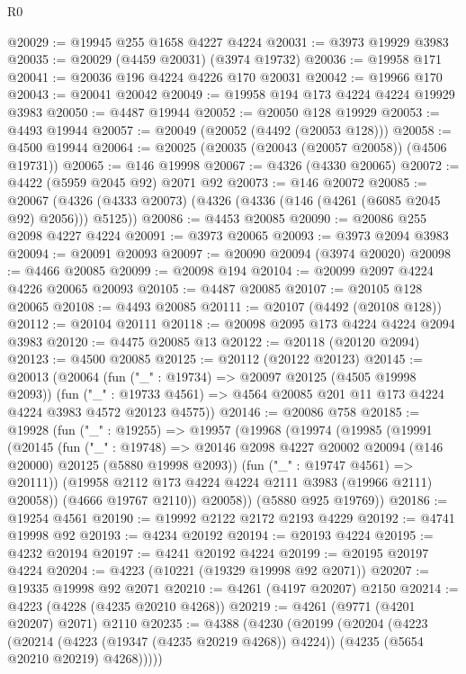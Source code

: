 \begin{lexlean}{R0}
\begin{coremodule}
@20029 := @19945 @255 @1658 @4227 @4224
@20031 := @3973 @19929 @3983
@20035 := @20029 (@4459 @20031) (@3974 @19732)
@20036 := @19958 @171
@20041 := @20036 @196 @4224 @4226 @170 @20031
@20042 := @19966 @170
@20043 := @20041 @20042
@20049 := @19958 @194 @173 @4224 @4224 @19929 @3983
@20050 := @4487 @19944
@20052 := @20050 @128 @19929
@20053 := @4493 @19944
@20057 := @20049 (@20052 (@4492 (@20053 @128)))
@20058 := @4500 @19944
@20064 := @20025 (@20035 (@20043 (@20057 @20058)) (@4506 @19731))
@20065 := @146 @19998
@20067 := @4326 (@4330 @20065)
@20072 := @4422 (@5959 @2045 @92) @2071 @92
@20073 := @146 @20072
@20085 := @20067 (@4326 (@4333 @20073) (@4326 (@4336 (@146 (@4261 (@6085 @2045 @92) @2056))) @5125))
@20086 := @4453 @20085
@20090 := @20086 @255 @2098 @4227 @4224
@20091 := @3973 @20065
@20093 := @3973 @2094 @3983
@20094 := @20091 @20093
@20097 := @20090 @20094 (@3974 @20020)
@20098 := @4466 @20085
@20099 := @20098 @194
@20104 := @20099 @2097 @4224 @4226 @20065 @20093
@20105 := @4487 @20085
@20107 := @20105 @128 @20065
@20108 := @4493 @20085
@20111 := @20107 (@4492 (@20108 @128))
@20112 := @20104 @20111
@20118 := @20098 @2095 @173 @4224 @4224 @2094 @3983
@20120 := @4475 @20085 @13
@20122 := @20118 (@20120 @2094)
@20123 := @4500 @20085
@20125 := @20112 (@20122 @20123)
@20145 := @20013
    (@20064
      (fun ("_" : @19734) => @20097 @20125 (@4505 @19998 @2093))
      (fun ("_" : @19733 @4561) => @4564 @20085 @201 @11 @173 @4224 @4224 @3983 @4572 @20123 @4575))
@20146 := @20086 @758
@20185 := @19928
    (fun ("_" : @19255) =>
    @19957
      (@19968
        (@19974
          (@19985
            (@19991
              (@20145
                (fun ("_" : @19748) =>
                @20146 @2098 @4227 @20002 @20094 (@146 @20000) @20125 (@5880 @19998 @2093))
                (fun ("_" : @19747 @4561) => @20111))
              (@19958 @2112 @173 @4224 @4224 @2111 @3983 (@19966 @2111) @20058))
            (@4666 @19767 @2110))
          @20058))
      (@5880 @925 @19769))
@20186 := @19254 @4561
@20190 := @19992 @2122 @2172 @2193 @4229
@20192 := @4741 @19998 @92
@20193 := @4234 @20192
@20194 := @20193 @4224
@20195 := @4232 @20194
@20197 := @4241 @20192 @4224
@20199 := @20195 @20197 @4224
@20204 := @4223 (@10221 (@19329 @19998 @92 @2071))
@20207 := @19335 @19998 @92 @2071
@20210 := @4261 (@4197 @20207) @2150
@20214 := @4223 (@4228 (@4235 @20210 @4268))
@20219 := @4261 (@9771 (@4201 @20207) @2071) @2110
@20235 := @4388
    (@4230
      (@20199
        (@20204
          (@4223
            (@20214 (@4223 (@19347 (@4235 @20219 @4268)) @4224))
            (@4235 (@5654 @20210 @20219) @4268)))))

\end{coremodule}
\end{lexlean}

